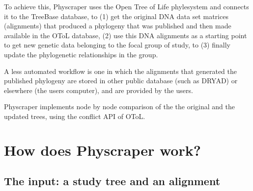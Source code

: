 \documentclass[]{article}
\begin{document}
To achieve this, Physcraper uses the Open Tree of Life phylesystem and connects it
to the TreeBase database, to (1) get the original DNA data set matrices (alignments) that produced
a phylogeny that was published and then made available in the OToL database, (2)
use this DNA alignments as a starting point to get new genetic data belonging
to the focal group of study, to (3) finally update the phylogenetic relationships in the group.

A less automated workflow is one in which the alignments that generated the published
phylogeny are stored in other public database (such as DRYAD) or elsewhere (the users computer), and
are provided by the users.

Physcraper implements node by node comparison of the the original and the updated trees, using the conflict API of OToL.

\hypertarget{how-does-physcraper-work}{%
\section{How does Physcraper work?}\label{how-does-physcraper-work}}

\hypertarget{the-input-a-study-tree-and-an-alignment}{%
\subsection{The input: a study tree and an alignment}\label{the-input-a-study-tree-and-an-alignment}}
\end{document}
